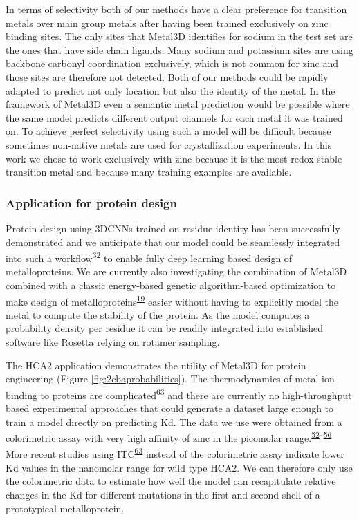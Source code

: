 \documentclass[  ASAPversion,
  ,
  9pt]{elife}
\begin{document}
In terms of selectivity both of our methods have a clear preference for transition metals over main group metals after having been trained exclusively on zinc binding sites. The only sites that Metal3D identifies for sodium in the test set are the ones that have side chain ligands. Many sodium and potassium sites are using backbone carbonyl coordination exclusively, which is not common for zinc and those sites are therefore not detected. Both of our methods could be rapidly adapted to predict not only location but also the identity of the metal. In the framework of Metal3D even a semantic metal prediction would be possible where the same model predicts different output channels for each metal it was trained on. To achieve perfect selectivity using such a model will be difficult because sometimes non-native metals are used for crystallization experiments. In this work we chose to work exclusively with zinc because it is the most redox stable transition metal and because many training examples are available.

\hypertarget{application-for-protein-design}{%
\subsubsection{Application for protein design}\label{application-for-protein-design}}

Protein design using 3DCNNs trained on residue identity has been successfully demonstrated and we anticipate that our model could be seamlessly integrated into such a workflow\textsuperscript{\protect\hyperlink{ref-6szq3cwi}{32}} to enable fully deep learning based design of metalloproteins. We are currently also investigating the combination of Metal3D combined with a classic energy-based genetic algorithm-based optimization to make design of metalloproteins\textsuperscript{\protect\hyperlink{ref-nlfa683y}{19}} easier without having to explicitly model the metal to compute the stability of the protein. As the model computes a probability density per residue it can be readily integrated into established software like Rosetta relying on rotamer sampling.

The HCA2 application demonstrates the utility of Metal3D for protein engineering (Figure \ref{fig:2cbaprobabilities}). The thermodynamics of metal ion binding to proteins are complicated\textsuperscript{\protect\hyperlink{ref-TlDhIlX}{63}} and there are currently no high-throughput based experimental approaches that could generate a dataset large enough to train a model directly on predicting Kd. The data we use were obtained from a colorimetric assay with very high affinity of zinc in the picomolar range.\textsuperscript{\protect\hyperlink{ref-D3VQQdjb}{52}--\protect\hyperlink{ref-TNbPH3Y1}{56}} More recent studies using ITC\textsuperscript{\protect\hyperlink{ref-TlDhIlX}{63}} instead of the colorimetric assay indicate lower Kd values in the nanomolar range for wild type HCA2. We can therefore only use the colorimetric data to estimate how well the model can recapitulate relative changes in the Kd for different mutations in the first and second shell of a prototypical metalloprotein.
\end{document}
